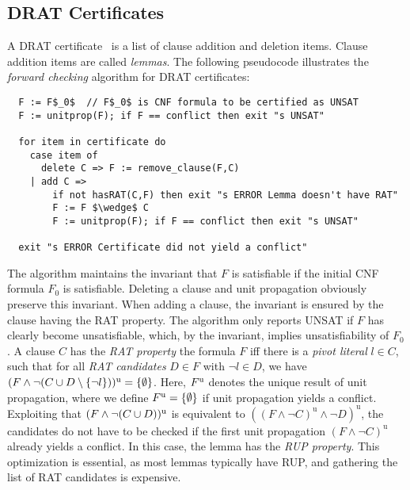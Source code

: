 \documentclass{llncs}
\begin{document}
% 
% 


\subsection{DRAT Certificates}\label{sec:bg}
A DRAT certificate~\cite{WHH14} is a list of clause addition and deletion items. Clause addition items are called \emph{lemmas}.
The following pseudocode illustrates the \emph{forward checking} algorithm for DRAT certificates:
\begin{lstlisting}
  F := F$_0$  // F$_0$ is CNF formula to be certified as UNSAT
  F := unitprop(F); if F == conflict then exit "s UNSAT"
  
  for item in certificate do
    case item of
      delete C => F := remove_clause(F,C)
    | add C =>
        if not hasRAT(C,F) then exit "s ERROR Lemma doesn't have RAT"
        F := F $\wedge$ C
        F := unitprop(F); if F == conflict then exit "s UNSAT"
  
  exit "s ERROR Certificate did not yield a conflict"
\end{lstlisting}
The algorithm maintains the invariant that $F$ is satisfiable if the initial CNF formula $F_0$ is satisfiable.
Deleting a clause and unit propagation obviously preserve this invariant. When adding a clause, the invariant 
is ensured by the clause having the RAT property. The algorithm only reports UNSAT if $F$ has clearly become unsatisfiable, 
which, by the invariant, implies unsatisfiability of $F_0$.
A clause $C$ has the \emph{RAT property} \wrt the formula $F$ iff there is
a \emph{pivot literal} $l\in C$, such that for all \emph{RAT candidates} $D\in F$ with $\neg l \in D$, we have $(F \wedge \neg(C \cup D\setminus\{\neg l\}))^{\textrm u} = \{\emptyset\}$.
Here, $F^{\textrm u}$ denotes the unique result of unit propagation, where we define $F^{\textrm u} = \{\emptyset\}$ if unit propagation yields a conflict.
Exploiting that $(F\wedge\neg(C\cup D))^\textrm{u}$ is equivalent to $((F \wedge \neg C)^\textrm{u} \wedge \neg D)^\textrm{u}$, the candidates do not have to 
be checked if the first unit propagation $(F \wedge \neg C)^\textrm{u}$ already yields a conflict. In this case, the lemma has the \emph{RUP property}.
This optimization is essential, as most lemmas typically have RUP, and gathering the list of RAT candidates is expensive.
\end{document}
